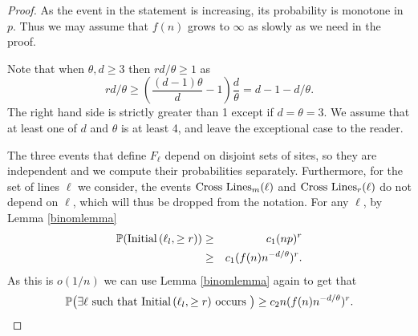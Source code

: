 \documentclass{amsart}
\newcommand{\prob}{\mathbb{P}}
\newcommand{\threshold}{\theta}
\newcommand{\noodle}{r}
\newcommand{\I}[2]{\hbox{Initial}\left(#1, \geq #2\right)}
\newcommand{\Gone}[1]{\hbox{Cross Lines}_m(#1)}
\newcommand{\Gtwo}[1]{\hbox{Cross Lines}_r(#1)}
\numberwithin{equation}{section}
\newcommand{\Ln}{\ell}
\theoremstyle{definition}
\theoremstyle{remark}
\begin{document}

\begin{proof}
As the event in the statement is increasing, its probability is monotone in $p$. Thus we may 
assume that $f(n)$ grows to $\infty$ as slowly as we need in the proof. 

Note that when $\threshold, d \geq 3$ then $\noodle d/\threshold \geq 1$ as
$$\noodle d/\threshold \geq \left( \frac{(d-1)\threshold}{d} -1\right) \frac{d}{\threshold} = d-1- d/\threshold.$$  
The right hand side is strictly 
greater than 1 except if $d=\threshold=3$. We assume that at least one of $d$ and $\threshold$ 
is at least 4, and leave the exceptional case to the reader. 

The three events that define $F_\Ln$ depend on disjoint sets of sites, so they are independent
and we compute their probabilities separately. 
Furthermore, for the set of lines $\Ln$ we consider, the events 
$\Gone{\Ln}$ and $\Gtwo{\Ln}$ do not depend on $\Ln$, which will thus be dropped from 
the notation.
For any $\Ln$, by Lemma \ref{binomlemma}
\begin{eqnarray*}
\prob(\I{\Ln_l}{\noodle})
 &\geq& c_1  (np)^{\noodle}\\
 &\geq& c_1  (f(n)n^{-d/\threshold})^{\noodle}.
\end{eqnarray*}
As this is $o(1/n)$ we can use Lemma \ref{binomlemma} again to get that
$$\prob\big(\text{$\exists \Ln$ such that $\I{\Ln_l}{\noodle}$ occurs } \big) \geq  c_2  n (f(n)n^{-d/\threshold})^{\noodle}.$$
%
%
\begin{comment}
\begin{eqnarray*}
\prob(\I{\Ln_l}{\noodle})
 &\geq&  {n/3 \choose \noodle}p^{\noodle}(1-p)^{n/3-\noodle}\\
 &\geq& c_1  (np)^{\noodle}\\
 &\geq& c_1  (f(n)n^{-d/\threshold})^{\noodle}.
\end{eqnarray*}
Provided that $f(n)$ does not grow too quickly the right hand side is much smaller than $1/n$ so we get
$$\prob\left(\text{$\exists \Ln$ such that $\I{\Ln_l}{\noodle}$ occurs}\right) \geq  .5 c_1  n (f(n)n^{-d/\threshold})^{\noodle}.$$
\end{comment}


\end{proof}
\end{document}
